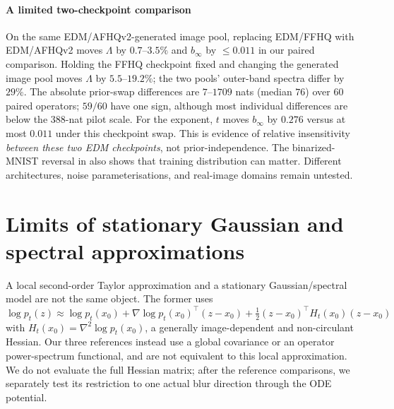 \documentclass[10pt,journal]{IEEEtran}
\newcommand{\Lam}{\Lambda}
\begin{document}
\paragraph*{A limited two-checkpoint comparison}
On the same EDM/AFHQv2-generated image pool, replacing EDM/FFHQ with EDM/AFHQv2 moves $\Lam$
by $0.7$--$3.5\%$ and $b_\infty$ by $\le0.011$ in our paired comparison. Holding the FFHQ
checkpoint fixed and changing the generated image pool moves $\Lam$ by $5.5$--$19.2\%$; the
two pools' outer-band spectra differ by $29\%$. The absolute prior-swap differences are
$7$--$1709$ nats (median $76$) over 60 paired operators; $59/60$ have one sign, although most
individual differences are below the $388$-nat pilot scale. For the exponent, $t$ moves
$b_\infty$ by $0.276$ versus at most $0.011$ under this checkpoint swap. This is evidence of
relative insensitivity \emph{between these two EDM checkpoints}, not prior-independence. The
binarized-MNIST reversal in \cite{nguyen2025morsebott} also shows that training distribution
can matter. Different architectures, noise parameterisations, and real-image domains remain
untested.

\section{Limits of stationary Gaussian and spectral approximations}
\label{sec:mech}

A local second-order Taylor approximation and a stationary Gaussian/spectral model are not the
same object. The former uses
$\log p_t(z)\approx\log p_t(x_0)+\nabla\log p_t(x_0)^\top(z-x_0)
+\tfrac12(z-x_0)^\top H_t(x_0)(z-x_0)$ with $H_t(x_0)=\nabla^2\log p_t(x_0)$, a generally
image-dependent and non-circulant Hessian. Our three references instead use a global covariance
or an operator power-spectrum functional, and are not equivalent to this local approximation.
We do not evaluate the full Hessian matrix; after the reference comparisons, we separately test
its restriction to one actual blur direction through the ODE potential.
\end{document}
